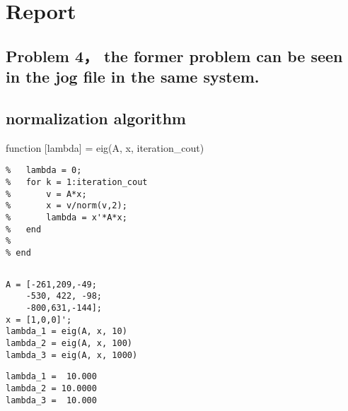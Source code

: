 \documentclass[10pt]{article}
\begin{document}
{\Huge\section*{Report}}

\tableofcontents
\vspace*{4em}



{}
\subsection*{Problem 4， the former problem can be seen in the jog file in the same system.}



{}
\subsection*{normalization algorithm}



function [lambda] = eig(A, x, iteration\_cout)

\begin{lstlisting}
%	lambda = 0;
%	for k = 1:iteration_cout
%		v = A*x;
%		x = v/norm(v,2);
%		lambda = x'*A*x;
%	end
%
% end
\end{lstlisting}
\begin{lstlisting}[language={},xleftmargin=5pt,frame=none]

\end{lstlisting}
\begin{lstlisting}
A = [-261,209,-49;
	-530, 422, -98;
	-800,631,-144];
x = [1,0,0]';
lambda_1 = eig(A, x, 10)
lambda_2 = eig(A, x, 100)
lambda_3 = eig(A, x, 1000)
\end{lstlisting}
\begin{lstlisting}[language={},xleftmargin=5pt,frame=none]
lambda_1 =  10.000
lambda_2 = 10.0000
lambda_3 =  10.000

\end{lstlisting}
\end{document}
